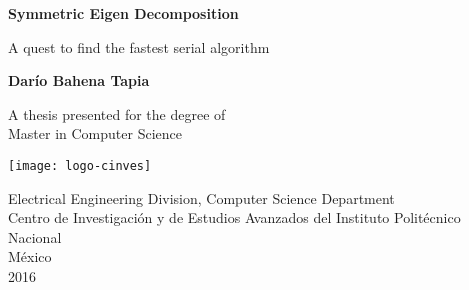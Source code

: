 \begin{titlepage}
  \begin{center}
    \vspace*{1cm}

    {\Large \textbf{Symmetric Eigen Decomposition}}

    \vspace{0.5cm}
    A quest to find the fastest serial algorithm

    \vspace{1.5cm}

    \textbf{Darío Bahena Tapia}

    \vfill

    A thesis presented for the degree of\\
    Master in Computer Science

    \vspace{0.8cm}

    \texttt{[image: logo-cinves]}

    \vspace{0.8cm}
    {
      \footnotesize
      Electrical Engineering Division, Computer Science Department\\
      Centro de Investigación y de Estudios Avanzados del Instituto Politécnico Nacional\\
      México\\
      2016
    }

  \end{center}
\end{titlepage}
